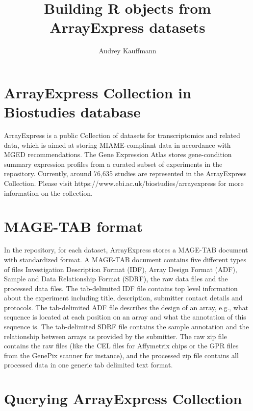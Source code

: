 \documentclass[a4paper]{article}
\begin{document}


\title{ Building R objects from ArrayExpress datasets }

\author{Audrey Kauffmann}
\maketitle

\section{ArrayExpress Collection in Biostudies database} 

ArrayExpress is a public Collection of datasets for transcriptomics and related data, which is aimed at storing MIAME-compliant data in accordance with MGED recommendations. The Gene Expression Atlas stores gene-condition summary expression profiles from a curated subset of experiments in the repository.
Currently, around 76,635 studies are represented in the ArrayExpress Collection. Please visit https://www.ebi.ac.uk/biostudies/arrayexpress for more information on the collection.

\section{MAGE-TAB format}
In the repository, for each dataset, ArrayExpress stores a MAGE-TAB document with standardized format. A MAGE-TAB document contains five different types of files Investigation Description Format (IDF), Array Design Format (ADF), Sample and Data Relationship Format (SDRF), the raw data files and the processed data files. The tab-delimited IDF file contains top level information about the experiment including title, description, submitter contact details and protocols. The tab-delimited ADF file describes the design of an array, e.g., what sequence is located at each position on an array and what the annotation of this sequence is. The tab-delimited SDRF file contains the sample annotation and the relationship between arrays as provided by the submitter. The raw zip file contains the raw files (like the CEL files for Affymetrix chips or the GPR files from the GenePix scanner for instance),  and the processed zip file contains all processed data in one generic tab delimited text format.

\section{Querying ArrayExpress Collection}
\end{document}
